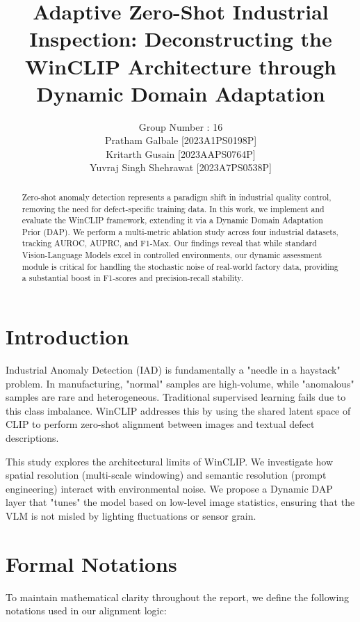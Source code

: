 \documentclass[10pt,twocolumn]{article}
\title{\textbf{Adaptive Zero-Shot Industrial Inspection: Deconstructing the WinCLIP Architecture through Dynamic Domain Adaptation}}
\author{Group Number : 16 \\ Pratham Galbale [2023A1PS0198P] \\Kritarth Gusain [2023AAPS0764P]\\Yuvraj Singh Shehrawat [2023A7PS0538P]}
\begin{document}
\maketitle

\begin{abstract}
Zero-shot anomaly detection represents a paradigm shift in industrial quality control, removing the need for defect-specific training data. In this work, we implement and evaluate the WinCLIP framework, extending it via a Dynamic Domain Adaptation Prior (DAP). We perform a multi-metric ablation study across four industrial datasets, tracking AUROC, AUPRC, and F1-Max. Our findings reveal that while standard Vision-Language Models excel in controlled environments, our dynamic assessment module is critical for handling the stochastic noise of real-world factory data, providing a substantial boost in F1-scores and precision-recall stability.
\end{abstract}

\section{Introduction}
Industrial Anomaly Detection (IAD) is fundamentally a "needle in a haystack" problem. In manufacturing, "normal" samples are high-volume, while "anomalous" samples are rare and heterogeneous. Traditional supervised learning fails due to this class imbalance. WinCLIP addresses this by using the shared latent space of CLIP to perform zero-shot alignment between images and textual defect descriptions.

This study explores the architectural limits of WinCLIP. We investigate how spatial resolution (multi-scale windowing) and semantic resolution (prompt engineering) interact with environmental noise. We propose a Dynamic DAP layer that "tunes" the model based on low-level image statistics, ensuring that the VLM is not misled by lighting fluctuations or sensor grain.

\section{Formal Notations}
To maintain mathematical clarity throughout the report, we define the following notations used in our alignment logic:
\end{document}
